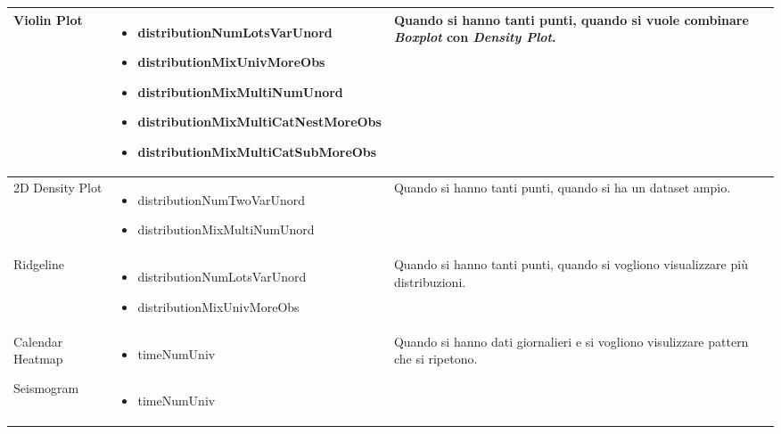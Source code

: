 \begin{xltabular}{\columnwidth}{|p{0.15\columnwidth}|X|p{0.27\columnwidth}|}
    \hline
    Violin Plot & 
    \vspace{-3.5mm}
    \begin{itemize}[noitemsep,topsep=0pt, left=0pt]
        \item distributionNumLotsVarUnord
        \item distributionMixUnivMoreObs
        \item distributionMixMultiNumUnord
        \item distributionMixMultiCatNestMoreObs
        \item distributionMixMultiCatSubMoreObs
    \end{itemize} & 
    Quando si hanno tanti punti, quando si vuole combinare \emph{Boxplot} con \emph{Density Plot}. \\
    \hline
    2D Density Plot & 
    \vspace{-3.5mm}
    \begin{itemize}[noitemsep,topsep=0pt, left=0pt]
        \item distributionNumTwoVarUnord
        \item distributionMixMultiNumUnord
    \end{itemize} & 
    Quando si hanno tanti punti, quando si ha un dataset ampio. \\
    \hline
    Ridgeline & 
    \vspace{-3.5mm}
    \begin{itemize}[noitemsep,topsep=0pt, left=0pt]
        \item distributionNumLotsVarUnord
        \item distributionMixUnivMoreObs
    \end{itemize} & 
    Quando si hanno tanti punti, quando si vogliono visualizzare più distribuzioni. \\
    \hline
    Calendar Heatmap & 
    \vspace{-3.5mm}
    \begin{itemize}[noitemsep,topsep=0pt, left=0pt]
        \item timeNumUniv
    \end{itemize} & 
    Quando si hanno dati giornalieri e si vogliono visulizzare pattern che si ripetono. \\
    \hline
    Seismogram & 
    \vspace{-3.5mm}
    \begin{itemize}[noitemsep,topsep=0pt, left=0pt]
        \item timeNumUniv
    \end{itemize} & 

\end{xltabular}
